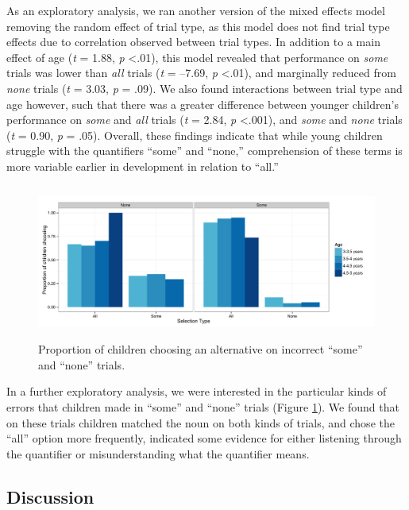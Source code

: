 \documentclass[man]{apa2}
\begin{document}
As an exploratory analysis, we ran another version of the mixed effects model removing the random effect of trial type, as this model does not find trial type effects due to correlation observed between trial types. In addition to a main effect of age (\textit{t} = 1.88, \textit{p} \textless  .01), this model revealed that performance on \textit{some} trials was lower than \textit{all} trials (\textit{t} = --7.69, \textit{p} \textless  .01), and marginally reduced from \textit{none} trials (\textit{t} = 3.03, \textit{p} = .09). We also found interactions between trial type and age however, such that there was a greater difference between younger children's performance on \textit{some} and \textit{all} trials (\textit{t} = 2.84, \textit{p} \textless  .001), and \textit{some} and \textit{none} trials (\textit{t} = 0.90, \textit{p} = .05). Overall, these findings indicate that while young children struggle with the quantifiers ``some'' and ``none,'' comprehension of these terms is more variable earlier in development in relation to ``all.'' 

\begin{figure} 
 \begin{center} 
  \includegraphics[height=2in]{figures/exp2_wrong.pdf} 
  \caption{\label{fig:exp2_wrong} Proportion of children choosing an alternative on incorrect ``some'' and ``none'' trials.} 
 \end{center} 
\end{figure}

In a further exploratory analysis, we were interested in the particular kinds of errors that children made in ``some'' and ``none'' trials (Figure \ref{fig:exp2_wrong}). We found that on these trials children matched the noun on both kinds of trials, and chose the ``all'' option more frequently, indicated some evidence for either listening through the quantifier or misunderstanding what the quantifier means. 


\subsection{Discussion}
\end{document}
